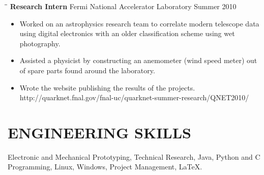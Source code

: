 \documentclass{res}
\begin{document}
\begin{resume}
   \begin{tabbing}
   \hspace{2.3in}\= \hspace{2.6in}\= \kill %
    {\bf Research Intern} \>Fermi National Accelerator Laboratory     \>Summer 2010\\
   \end{tabbing}\vspace{-20pt}      %
   \begin{itemize}
      \item Worked on an astrophysics research team to correlate modern telescope data using digital electronics with an older classification scheme using wet photography.
      \item Assisted a physicist by constructing an anemometer (wind speed meter) out of spare parts found around the laboratory.
      \item Wrote the website publishing the results of the projects.\\ http://quarknet.fnal.gov/fnal-uc/quarknet-summer-research/QNET2010/
   \end{itemize}



\section{ENGINEERING SKILLS}          
    Electronic and Mechanical Prototyping, Technical Research, Java, Python and C Programming, Linux, Windows, Project Management, \LaTeX.
 

\end{resume}
\end{document}
